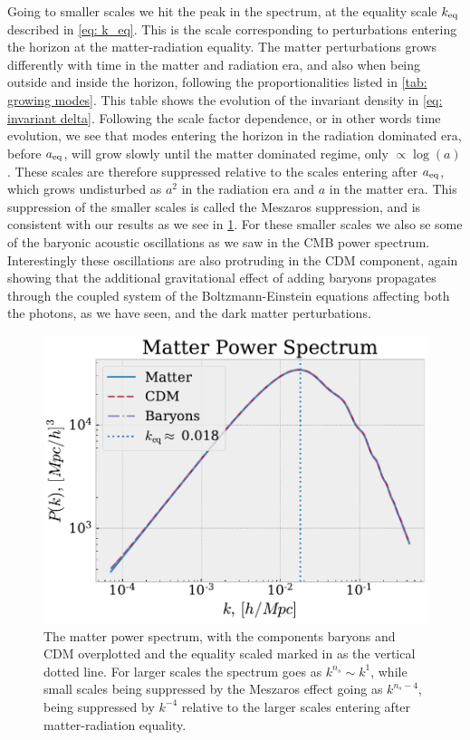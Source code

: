\documentclass[10pt,a4paper]{article}
\providecommand{\rCDM}
{\ensuremath{
\textrm{CDM}
}
}
\begin{document}
Going to smaller scales we hit the peak in the spectrum, at the equality scale $k_{\rm{eq}}$ described in \cref{eq: k_eq}. This is the scale corresponding to perturbations entering the horizon at the matter-radiation equality. The matter perturbations grows differently with time in the matter and radiation era, and also when being outside and inside the horizon, following the proportionalities listed in \cref{tab: growing modes}. This table shows the evolution of the invariant density in \cref{eq: invariant delta}. Following the scale factor dependence, or in other words time evolution, we see that modes entering the horizon in the radiation dominated era, before $a_{\rm{eq}}$, will grow slowly until the matter dominated regime, only $\propto \log(a)$. These scales are therefore suppressed relative to the scales entering after $a_{\rm{eq}}$, which grows undisturbed as $a^2$ in the radiation era and $a$ in the matter era. This suppression of the smaller scales is called the Meszaros suppression, and is consistent with our results as we see in \cref{fig: matter power spectrum}. For these smaller scales we also se some of the baryonic acoustic oscillations as we saw in the CMB power spectrum. Interestingly these oscillations are also protruding in the \rCDM component, again showing that the additional gravitational effect of adding baryons propagates through the coupled system of the Boltzmann-Einstein equations affecting both the photons, as we have seen, and the dark matter perturbations.
\begin{figure}[ht!]
  \centering
  \includegraphics[scale=0.5]{../figs/comp_PS_matteronly.pdf}
  \caption{The matter power spectrum, with the components baryons and \rCDM overplotted and the equality scaled marked in as the vertical dotted line. For larger scales the spectrum goes as $k^{n_s}\sim k^1$, while small scales being suppressed by the Meszaros effect going as $k^{n_s-4}$, being suppressed by $k^{-4}$ relative to the larger scales entering after matter-radiation equality.}
  \label{fig: matter power spectrum}
\end{figure}
\vspace{0.5cm}
\noindent
\end{document}
